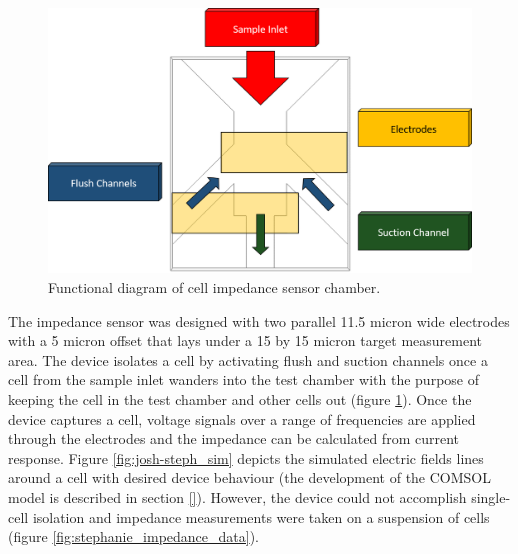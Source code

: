 \begin{figure}[h]
    \centering
    \includegraphics[width=\textwidth]{images/josh_steph_design.png}
    \caption{Functional diagram of cell impedance sensor chamber.}
    \label{fig:josh-steph_functional_diagram}
\end{figure}

\par The impedance sensor was designed with two parallel 11.5 micron wide electrodes with a 5 micron offset that lays under a 15 by 15 micron target measurement area. The device isolates a cell by activating flush and suction channels once a cell from the sample inlet wanders into the test chamber with the purpose of keeping the cell in the test chamber and other cells out (figure \ref{fig:josh-steph_functional_diagram}). Once the device captures a cell, voltage signals over a range of frequencies are applied through the electrodes and the impedance can be calculated from current response.  Figure \ref{fig:josh-steph_sim} depicts the simulated electric fields lines around a cell with desired device behaviour (the development of the COMSOL model is described in section \ref{}). However, the device could not accomplish single-cell isolation and impedance measurements were taken on a suspension of cells (figure \ref{fig:stephanie_impedance_data}).

